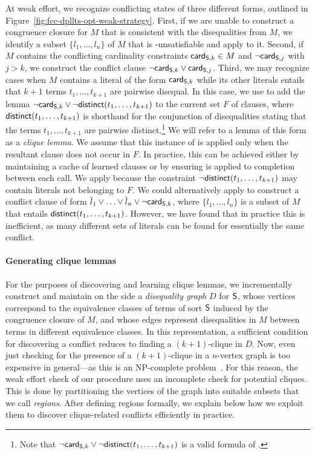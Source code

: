\documentclass{svjour3}                     %
\begin{document}
At weak effort, we recognize conflicting states of three different forms, outlined in Figure~\ref{fig:fcc-dpllts-opt-weak-strategy}.
First, if we are unable to construct a congruence closure for $M$ that is consistent with the disequalities from $M$,
we identify a subset $\{l_1, \ldots, l_n\}$ of $M$ that is \euf-unsatisfiable
and apply  to it.
Second, if $M$ contains the conflicting cardinality constraints $\card[\So,k] \in M$ and
$\neg \card[\So,j]$ with $j > k$,
we construct the conflict clause $\neg \card[\So,k] \vee \card[\So,j]$.
Third, we may recognize cases when $M$ contains a literal of the form $\card[\So,k]$
while its other literals entails that
$k+1$ terms $t_1, \ldots, t_{k+1}$ are pairwise disequal.
In this case, we use  to add the lemma 
$\neg \card[\So,k] \vee \neg \distinct( t_1, \ldots, t_{k+1} )$ to the current set $F$
of clauses,
where $\distinct( t_1, \ldots, t_{k+1} )$ is shorthand for the conjunction of disequalities stating that 
the terms $t_1, \ldots, t_{k+1}$ are pairwise distinct.\footnote{%
Note that $\neg \card[\So,k] \vee \neg \distinct( t_1, \ldots, t_{k+1} )$
is a valid formula of \fcc.
}
We will refer to a lemma of this form as a \emph{clique lemma}.
We assume that this instance of  is applied only 
when the resultant clause does not occur in $F$.
In practice, this can be achieved either 
by maintaining a cache of learned clauses or
by ensuring  is applied to completion between each call.
We apply  because the constraint 
$\neg \distinct( t_1, \ldots, t_{k+1} )$ may contain literals not belonging to $F$.
We could alternatively apply  to construct a conflict clause of form 
$\compl{l}_1 \vee \ldots \vee \compl{l}_n \vee \neg \card[\So,k]$,
where $\{l_1, \ldots, l_n\}$ is a subset of $M$ 
that entails $\distinct( t_1, \ldots, t_{k+1} )$.
However, we have found that in practice this is inefficient, 
as many different sets of literals can be found for essentially the same conflict.

\paragraph{Generating clique lemmas}
For the purposes of discovering and learning clique lemmas,
we incrementally construct and maintain on the side a \emph{disequality graph} $D$ for $\So$, 
whose vertices correspond to the equivalence classes of terms of sort $\So$
induced by the congruence closure of $M$,
and whose edges represent disequalities in $M$ between terms in different equivalence classes.
In this representation, a sufficient condition for discovering a conflict 
reduces to finding a $(k+1)$-clique in $D$.
Now, even just checking for the presence of a $(k+1)$-clique 
in a $n$-vertex graph is too expensive in general---as 
this is an NP-complete problem~\cite{Garey:1974:SNP:800119.803884}.
For this reason, the weak effort check of our procedure uses an incomplete check 
for potential cliques.
This is done by partitioning the vertices of the graph into suitable
subsets that we call \emph{regions}.
After defining regions formally, we explain below how we exploit them 
to discover clique-related conflicts efficiently in practice.
\end{document}
